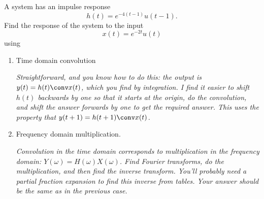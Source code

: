 A system has an impulse response
\begin{equation*}
  h(t) = e^{-4(t - 1)} u(t-1).
\end{equation*}
Find the response of the system to the input
\begin{equation*}
  x(t) = e^{-2t} u(t)
\end{equation*}
using
\begin{enumerate}
\item Time domain convolution \newline

{\it Straightforward, and you know how to do this:  the output is
$y(t) = h(t) \conv x(t)$, which you find by integration.  I find
it easier to shift $h(t)$ backwards by one so that it starts at
the origin, do the convolution, and shift the answer forwards by
one to get the required answer.  This uses the property that
$y(t+1) = h(t+1) \conv x(t)$.} \newline

\item Frequency domain multiplication. \newline

{\it Convolution in the time domain corresponds to multiplication
in the frequency domain:  $Y(\omega) = H(\omega) X(\omega)$.  Find
Fourier transforms, do the multiplication, and then find the
inverse transform.  You'll probably need a partial fraction
expansion to find this inverse from tables.  Your answer should be
the same as in the previous case.} \newline

\end{enumerate}
